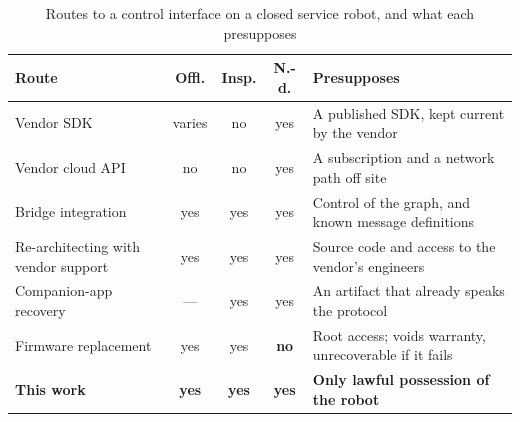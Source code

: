 %
%
\begin{table}[!t]
\caption{Routes to a control interface on a closed service robot, and what each presupposes}
\label{tab:positioning}
\centering
\scriptsize
\setlength{\tabcolsep}{3pt}
\begin{tabular}{@{}>{\raggedright\arraybackslash}p{1.75cm}ccc>{\raggedright\arraybackslash}p{2.3cm}@{}}
\toprule
\textbf{Route} & \textbf{Offl.} & \textbf{Insp.} & \textbf{N.-d.} & \textbf{Presupposes} \\
\midrule
Vendor SDK~\cite{glauser2023interop} & varies & no & yes &
A published SDK, kept current by the vendor \\[2pt]
Vendor cloud API & no & no & yes &
A subscription and a network path off site \\[2pt]
Bridge integration~\cite{crick2012rosbridge,aragao2016yarp} & yes & yes & yes &
Control of the \ros{} graph, and known message definitions \\[2pt]
Re-architecting with vendor support~\cite{kim2005reengineering} & yes & yes & yes &
Source code and access to the vendor's engineers \\[2pt]
Companion-app recovery~\cite{giese2018xiaomi,muhe2010kuka} & --- & yes & yes &
An artifact that already speaks the protocol \\[2pt]
Firmware replacement & yes & yes & \textbf{no} &
Root access; voids warranty, unrecoverable if it fails \\[2pt]
\textbf{This work} & \textbf{yes} & \textbf{yes} & \textbf{yes} &
\textbf{Only lawful possession of the robot} \\
\bottomrule
\end{tabular}
\end{table}
